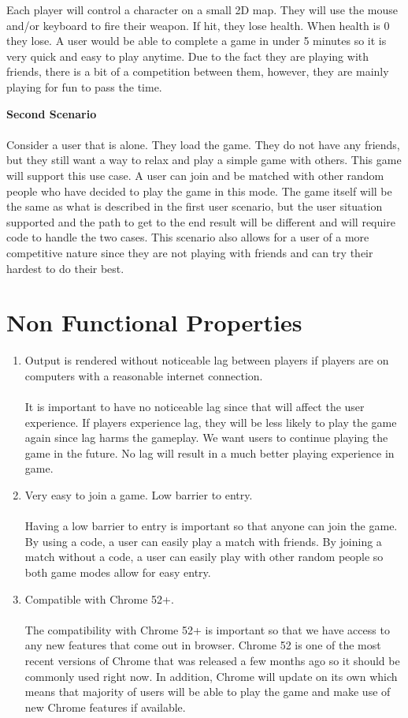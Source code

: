 \documentclass[11pt, oneside]{article}   	%
\begin{document}
Each player will control a character on a small 2D map. They will use the mouse and/or keyboard to fire their weapon. If hit, they lose health. When health is 0 they lose. A user would be able to complete a game in under 5 minutes so it is very quick and easy to play anytime. Due to the fact they are playing with friends, there is a bit of a competition between them, however, they are mainly playing for fun to pass the time. 

\clearpage

\noindent\textbf{Second Scenario}\\\\

Consider a user that is alone. They load the game. They do not have any friends, but they still want a way to relax and play a simple game with others. This game will support this use case. A user can join and be matched with other random people who have decided to play the game in this mode. The game itself will be the same as what is described in the first user scenario, but the user situation supported and the path to get to the end result will be different and will require code to handle the two cases. This scenario also allows for a user of a more competitive nature since they are not playing with friends and can try their hardest to do their best. 




\section{Non Functional Properties}
\begin{enumerate}
\item
Output is rendered without noticeable lag between players if players are on computers with a reasonable internet connection. \\\\
It is important to have no noticeable lag since that will affect the user experience. If players experience lag, they will be less likely to play the game again since lag harms the gameplay. We want users to continue playing the game in the future. No lag will result in a much better playing experience in game.
\item
Very easy to join a game. Low barrier to entry.\\\\
Having a low barrier to entry is important so that anyone can join the game. By using a code, a user can easily play a match with friends. By joining a match without a code, a user can easily play with other random people so both game modes allow for easy entry.
\item
Compatible with Chrome 52+.\\\\
The compatibility with Chrome 52+ is important so that we have access to any new features that come out in browser. Chrome 52 is one of the most recent versions of Chrome that was released a few months ago so it should be commonly used right now. In addition, Chrome will update on its own which means that majority of users will be able to play the game and make use of new Chrome features if available.

\end{enumerate}
\end{document}
